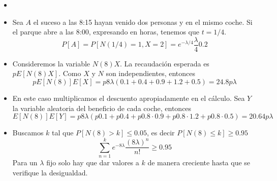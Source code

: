 \documentclass[twoside]{article}
\begin{document}
\begin{solucion} 
\begin{itemize}
\item[]
\item Sea $A$ el suceso a las 8:15 hayan venido dos personas y en el mismo coche. Si el parque abre a las 8:00, expresando en horas, tenemos que $t=1/4$.
$$
P[A] = P[N(1/4)=1,X=2] = e^{-\lambda/4}\frac{\lambda}{4}0.2
$$
\item Consideremos la variable $N(8) X$. La recaudación esperada es $pE[N(8)X]$. Como $X$ y $N$ son independientes, entonces
$$
pE[N(8)]E[X] = p8\lambda (0.1 + 0.4+0.9+1.2+0.5) = 24.8 p \lambda
$$
\item En este caso multiplicamos el descuento apropiadamente en el cálculo. Sea $Y$ la variable aleatoria del beneficio de cada coche, entonces
$$
E[N(8)]E[Y] = p8\lambda (p0.1 + p0.4+p0.8\cdot 0.9+p0.8\cdot 1.2+p 0.8\cdot 0.5) = 20.64 p \lambda
$$
\item Buscamos $k$ tal que $P[N(8)>k]\leq 0.05$, es decir $P[N(8)\leq k] \geq 0.95$
$$
\sum_{n=1}^k e^{-8\lambda}\frac{(8\lambda)^n}{n!} \geq 0.95 
$$
Para un $\lambda$ fijo solo hay que dar valores a $k$ de manera creciente hasta que se verifique la desigualdad.
\end{itemize}
\end{solucion}
\newpage
\end{document}
